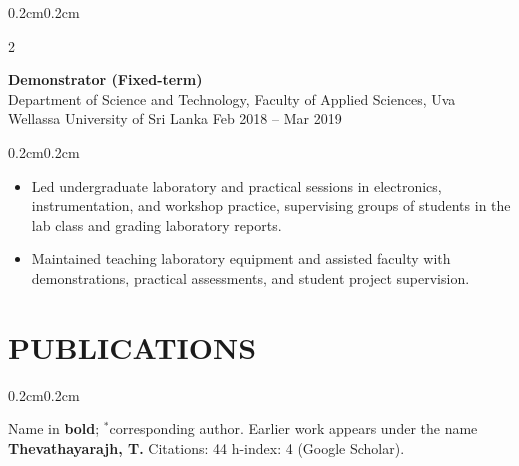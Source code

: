\documentclass[10pt, letterpaper]{article}
\newenvironment{highlights}{%
    \begin{itemize}[topsep=0.08cm, parsep=0.08cm, partopsep=0pt,
                    itemsep=0pt, leftmargin=0.4cm + 10pt]
}{\end{itemize}}
\newenvironment{onecolentry}{%
    \begin{adjustwidth}{0.2cm}{0.2cm}
}{\end{adjustwidth}}
\newenvironment{twocolentry}[2][]{%
    \onecolentry
    \def\secondColumn{#2}
    \setcolumnwidth{\fill, 4.2cm}
    \begin{paracol}{2}
}{%
    \switchcolumn \raggedleft \secondColumn
    \end{paracol}
    \endonecolentry
}
\begin{document}
\begin{twocolentry}{Feb 2018 -- Mar 2019}
    \textbf{Demonstrator (Fixed-term)} \\
    Department of Science and Technology, Faculty of Applied Sciences,
    Uva Wellassa University of Sri Lanka
\end{twocolentry}
\begin{onecolentry}
    \begin{highlights}
        \item Led undergraduate laboratory and practical sessions in electronics,
              instrumentation, and workshop practice, supervising groups of
              students in the lab class and grading laboratory reports.

        \item Maintained teaching laboratory equipment and assisted faculty with
              demonstrations, practical assessments, and student project
              supervision.
    \end{highlights}
    \vspace{0.08cm}
\end{onecolentry}

\section{PUBLICATIONS}
\vspace{0.04cm}
\begin{onecolentry}
    {\footnotesize Name in \textbf{bold}; $^{*}$corresponding author.
    Earlier work appears under the name \textbf{Thevathayarajh, T.}
    Citations: 44 \textbar{} h-index: 4 (Google Scholar).\par}
\end{onecolentry}
\vspace{0.12cm}
\end{document}

